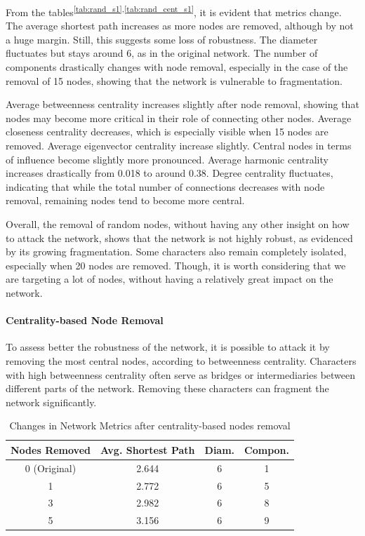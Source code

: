 \documentclass[10pt,twocolumn,letterpaper]{article}
\begin{document}
From the tables\textsuperscript{\ref{tab:rand_s1},\ref{tab:rand_cent_s1}}, it is evident that metrics change. The average shortest path increases as more nodes are removed, although by not a huge margin. Still, this suggests some loss of robustness. The diameter fluctuates but stays around 6, as in the original network. The number of components drastically changes with node removal, especially in the case of the removal of 15 nodes, showing that the network is vulnerable to fragmentation.

Average betweenness centrality increases slightly after node removal, showing that nodes may become more critical in their role of connecting other nodes. Average closeness centrality decreases, which is especially visible when 15 nodes are removed. 
Average eigenvector centrality increase slightly. Central nodes in terms of influence become slightly more pronounced.
Average harmonic centrality increases drastically from 0.018 to around 0.38. Degree centrality fluctuates, indicating that while the total number of connections decreases with node removal, remaining nodes tend to become more central.

Overall, the removal of random nodes, without having any other insight on how to attack the network, shows that the network is not highly robust, as evidenced by its growing fragmentation. Some characters also remain completely isolated, especially when 20 nodes are removed. Though, it is worth considering that we are targeting a lot of nodes, without having a relatively great impact on the network.


\paragraph{Centrality-based Node Removal}

To assess better the robustness of the network, it is possible to attack it by removing the most central nodes, according to betweenness centrality. Characters with high betweenness centrality often serve as bridges or intermediaries between different parts of the network. Removing these characters can fragment the network significantly.

\begin{table}[!h]
    \centering
    \small
    \begin{tabular}{c|c|c|c} 
        Nodes Removed & Avg. Shortest Path & Diam. & Compon. \\
        \hline
        0 (Original) & 2.644 & 6 & 1 \\
        1   & 2.772 & 6 & 5 \\
        3	& 2.982 & 6 & 8 \\
        5	& 3.156 & 6 & 9 \\
        \hline 
    \end{tabular} \\
    \caption{Changes in Network Metrics after centrality-based nodes removal}
    \label{tab:my_label}
\end{table}
\end{document}
